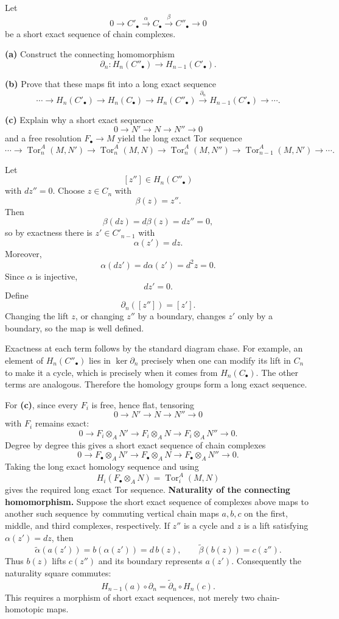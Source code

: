 \begin{problem}[CP-V-0046]
\label{prob:cp-v-0046}
Let
\[
0\longrightarrow C'_\bullet
\xrightarrow{\alpha}
C_\bullet
\xrightarrow{\beta}
C''_\bullet
\longrightarrow0
\]
be a short exact sequence of chain complexes.

\textbf{(a)} Construct the connecting homomorphism
\[
\partial_n:H_n(C''_\bullet)\longrightarrow H_{n-1}(C'_\bullet).
\]

\textbf{(b)} Prove that these maps fit into a long exact sequence
\[
\cdots\to
H_n(C'_\bullet)\to H_n(C_\bullet)\to H_n(C''_\bullet)
\xrightarrow{\partial_n}
H_{n-1}(C'_\bullet)\to\cdots.
\]

\textbf{(c)} Explain why a short exact sequence
\[
0\to N'\to N\to N''\to0
\]
and a free resolution \(F_\bullet\to M\) yield the long exact Tor sequence
\[
\cdots\to
\operatorname{Tor}_n^A(M,N')
\to
\operatorname{Tor}_n^A(M,N)
\to
\operatorname{Tor}_n^A(M,N'')
\to
\operatorname{Tor}_{n-1}^A(M,N')
\to\cdots.
\]
\end{problem}

\begin{solution}
Let
\[
[z'']\in H_n(C''_\bullet)
\]
with \(d z''=0\). Choose \(z\in C_n\) with
\[
\beta(z)=z''.
\]
Then
\[
\beta(dz)=d\beta(z)=dz''=0,
\]
so by exactness there is \(z'\in C'_{n-1}\) with
\[
\alpha(z')=dz.
\]
Moreover,
\[
\alpha(dz')=d\alpha(z')=d^2z=0.
\]
Since \(\alpha\) is injective,
\[
dz'=0.
\]
Define
\[
\partial_n([z''])=[z'].
\]
Changing the lift \(z\), or changing \(z''\) by a boundary, changes \(z'\)
only by a boundary, so the map is well defined.

Exactness at each term follows by the standard diagram chase. For example,
an element of \(H_n(C''_\bullet)\) lies in \(\ker\partial_n\) precisely when
one can modify its lift in \(C_n\) to make it a cycle, which is precisely
when it comes from \(H_n(C_\bullet)\). The other terms are analogous.
Therefore the homology groups form a long exact sequence.

For \textbf{(c)}, since every \(F_i\) is free, hence flat, tensoring
\[
0\to N'\to N\to N''\to0
\]
with \(F_i\) remains exact:
\[
0\to F_i\otimes_A N'
\to F_i\otimes_A N
\to F_i\otimes_A N''
\to0.
\]
Degree by degree this gives a short exact sequence of chain complexes
\[
0\to F_\bullet\otimes_A N'
\to F_\bullet\otimes_A N
\to F_\bullet\otimes_A N''
\to0.
\]
Taking the long exact homology sequence and using
\[
H_i(F_\bullet\otimes_A N)=\operatorname{Tor}_i^A(M,N)
\]
gives the required long exact Tor sequence.
\medskip
\noindent\textbf{Naturality of the connecting homomorphism.}
Suppose the short exact sequence of complexes above maps to another such
sequence by commuting vertical chain maps $a,b,c$ on the first, middle,
and third complexes, respectively. If $z''$ is a cycle and $z$ is a
lift satisfying $\alpha(z')=dz$, then
\[
\widetilde\alpha(a(z'))=b(\alpha(z'))=d\,b(z),
\qquad \widetilde\beta(b(z))=c(z'').
\]
Thus $b(z)$ lifts $c(z'')$ and its boundary represents $a(z')$.
Consequently the naturality square commutes:
\[
H_{n-1}(a)\circ\partial_n
=\widetilde\partial_n\circ H_n(c).
\]
This requires a morphism of short exact sequences, not merely two
chain-homotopic maps.

\end{solution}


